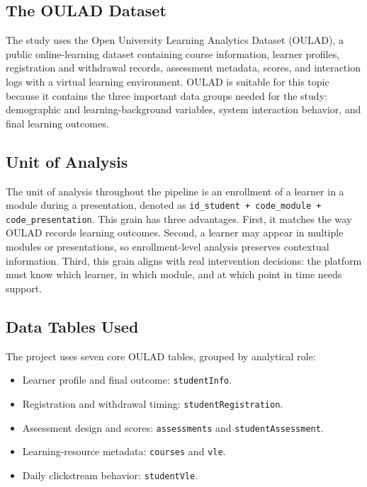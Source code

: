 \documentclass[conference]{IEEEtran}
\newcommand{\grain}{\texttt{id\_student + code\_module + code\_presentation}}
\begin{document}
\subsection{The OULAD Dataset}

The study uses the Open University Learning Analytics Dataset (OULAD), a public online-learning dataset containing course information, learner profiles, registration and withdrawal records, assessment metadata, scores, and interaction logs with a virtual learning environment. OULAD is suitable for this topic because it contains the three important data groups needed for the study: demographic and learning-background variables, system interaction behavior, and final learning outcomes.

\subsection{Unit of Analysis}

The unit of analysis throughout the pipeline is an enrollment of a learner in a module during a presentation, denoted as \grain{}. This grain has three advantages. First, it matches the way OULAD records learning outcomes. Second, a learner may appear in multiple modules or presentations, so enrollment-level analysis preserves contextual information. Third, this grain aligns with real intervention decisions: the platform must know which learner, in which module, and at which point in time needs support.

\subsection{Data Tables Used}

{\raggedright
The project uses seven core OULAD tables, grouped by analytical role:
\begin{itemize}
\item Learner profile and final outcome: \texttt{studentInfo}.
\item Registration and withdrawal timing: \texttt{studentRegistration}.
\item Assessment design and scores: \texttt{assessments} and \texttt{studentAssessment}.
\item Learning-resource metadata: \texttt{courses} and \texttt{vle}.
\item Daily clickstream behavior: \texttt{studentVle}.
\end{itemize}
\par}
\end{document}
